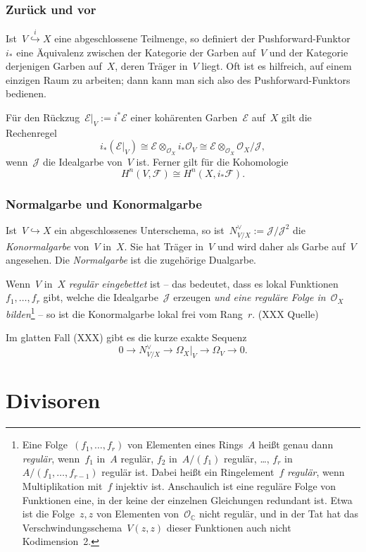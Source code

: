 \documentclass[a4paper,ngerman,12pt]{scrartcl}
\theoremstyle{definition}
\theoremstyle{plain}
\theoremstyle{remark}
\newcommand{\CC}{\mathbb{C}}
\newcommand{\E}{\mathcal{E}}
\newcommand{\F}{\mathcal{F}}
\newcommand{\J}{\mathcal{J}}
\renewcommand{\O}{\mathcal{O}}
\newcommand{\lra}{\longrightarrow}
\begin{document}
\subsubsection*{Zurück und vor}

Ist~$V \stackrel{i}{\hookrightarrow} X$ eine abgeschlossene Teilmenge, so
definiert der Pushforward-Funktor~$i_*$ eine Äquivalenz zwischen der Kategorie
der Garben auf~$V$ und der Kategorie derjenigen Garben auf~$X$, deren Träger
in~$V$ liegt. Oft ist es hilfreich, auf einem einzigen Raum zu arbeiten; dann
kann man sich also des Pushforward-Funktors bedienen.

Für den Rückzug~$\E|_V := i^* \E$ einer kohärenten Garben~$\E$ auf~$X$ gilt die
Rechenregel
\[ i_* (\E|_V) \cong \E \otimes_{\O_X} i_*\O_V \cong \E \otimes_{\O_X} \O_X/\J,
\]
wenn~$\J$ die Idealgarbe von~$V$ ist. Ferner gilt für die Kohomologie
\[ H^n(V, \F) \cong H^n(X, i_*\F). \]


\subsubsection*{Normalgarbe und Konormalgarbe}

Ist~$V \hookrightarrow X$ ein abgeschlossenes Unterschema, so ist~$N_{V/X}^\vee
:= \J/\J^2$ die \emph{Konormalgarbe} von~$V$ in~$X$. Sie hat Träger in~$V$ und
wird daher als Garbe auf~$V$ angesehen. Die \emph{Normalgarbe} ist die
zugehörige Dualgarbe.

Wenn~$V$ in~$X$ \emph{regulär eingebettet} ist -- das bedeutet, dass es lokal
Funktionen~$f_1,\ldots,f_r$ gibt, welche die Idealgarbe~$\J$ erzeugen \emph{und
eine reguläre Folge in~$\O_X$ bilden}\footnote{Eine Folge~$(f_1,\ldots,f_r)$
von Elementen eines Rings~$A$ heißt genau dann \emph{regulär}, wenn~$f_1$
in~$A$ regulär, $f_2$ in~$A/(f_1)$ regulär, \ldots, $f_r$
in~$A/(f_1,\ldots,f_{r-1})$ regulär ist. Dabei heißt ein Ringelement~$f$
\emph{regulär}, wenn Multiplikation mit~$f$ injektiv ist. Anschaulich ist eine
reguläre Folge von Funktionen eine, in der keine der einzelnen Gleichungen
redundant ist. Etwa ist die Folge~$z, z$ von Elementen von~$\O_\CC$ nicht
regulär, und in der Tat hat das Verschwindungsschema~$V(z,z)$ dieser Funktionen
auch nicht Kodimension~2.} -- so ist die Konormalgarbe lokal frei
vom Rang~$r$. (XXX Quelle)

Im glatten Fall (XXX) gibt es die kurze exakte Sequenz
\[ 0 \lra N_{V/X}^\vee \lra \Omega_X|_V \lra \Omega_V \lra 0. \]


\section{Divisoren}
\end{document}
